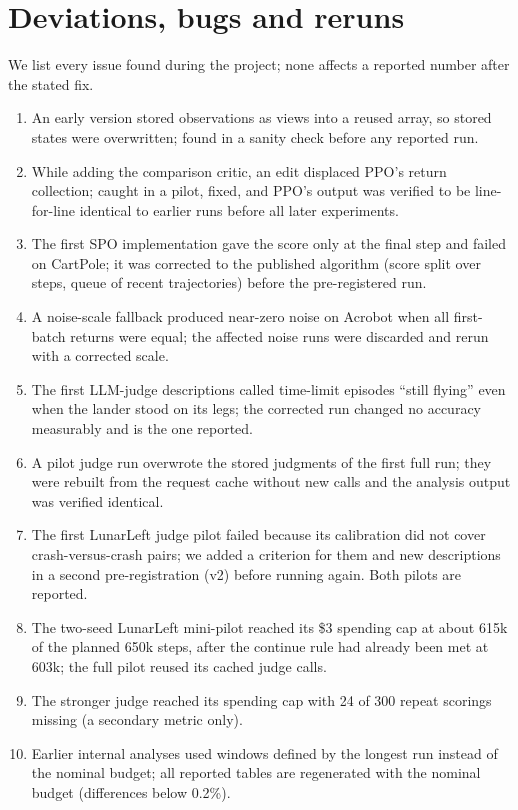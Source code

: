 \documentclass[11pt]{article}
\theoremstyle{remark}
\begin{document}
\section{Deviations, bugs and reruns}
\label{app:deviations}
We list every issue found during the project; none affects a reported number after the stated fix.
\begin{enumerate}
\item An early version stored observations as views into a reused array, so stored states were overwritten; found in a sanity check before any reported run.
\item While adding the comparison critic, an edit displaced PPO's return collection; caught in a pilot, fixed, and PPO's output was verified to be line-for-line identical to earlier runs before all later experiments.
\item The first SPO implementation gave the score only at the final step and failed on CartPole; it was corrected to the published algorithm (score split over steps, queue of recent trajectories) before the pre-registered run.
\item A noise-scale fallback produced near-zero noise on Acrobot when all first-batch returns were equal; the affected noise runs were discarded and rerun with a corrected scale.
\item The first LLM-judge descriptions called time-limit episodes ``still flying'' even when the lander stood on its legs; the corrected run changed no accuracy measurably and is the one reported.
\item A pilot judge run overwrote the stored judgments of the first full run; they were rebuilt from the request cache without new calls and the analysis output was verified identical.
\item The first LunarLeft judge pilot failed because its calibration did not cover crash-versus-crash pairs; we added a criterion for them and new descriptions in a second pre-registration (v2) before running again. Both pilots are reported.
\item The two-seed LunarLeft mini-pilot reached its \$3 spending cap at about 615k of the planned 650k steps, after the continue rule had already been met at 603k; the full pilot reused its cached judge calls.
\item The stronger judge reached its spending cap with 24 of 300 repeat scorings missing (a secondary metric only).
\item Earlier internal analyses used windows defined by the longest run instead of the nominal budget; all reported tables are regenerated with the nominal budget (differences below 0.2\%).
\end{enumerate}
\end{document}

